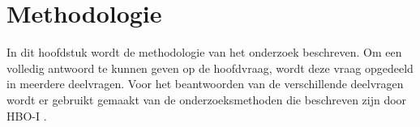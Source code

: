 \section{Methodologie}
In dit hoofdstuk wordt de methodologie van het onderzoek beschreven.
Om een volledig antwoord te kunnen geven op de hoofdvraag, wordt deze vraag opgedeeld in meerdere deelvragen.
Voor het beantwoorden van de verschillende deelvragen wordt er gebruikt gemaakt van de onderzoeksmethoden die beschreven zijn door HBO-I \Parencite{HBO-i-reasearch-methods}.





